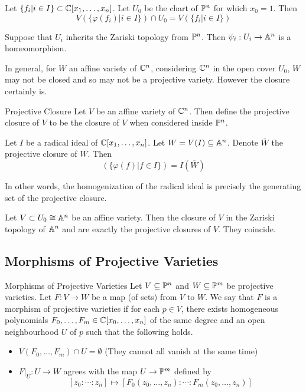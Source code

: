 \documentclass[a4paper]{article}
\begin{document}
\begin{lmm}{}{} Let $\{f_i|i\in I\}\subset\mathbb{C}[x_1,\dots,x_n]$. Let $U_0$ be the chart of $\mathbb{P}^n$ for which $x_0=1$. Then $$V(\{\varphi(f_i)|i\in I\})\cap U_0=V(\{f_i|i\in I\})$$
\end{lmm}

\begin{thm}{}{} Suppose that $U_i$ inherits the Zariski topology from $\mathbb{P}^n$. Then $\psi_i:U_i\to\mathbb{A}^n$ is a homeomorphism. 
\end{thm}

In general, for $W$ an affine variety of $\mathbb{C}^n$, considering $\mathbb{C}^n$ in the open cover $U_0$, $W$ may not be closed and so may not be a projective variety. However the closure certainly is. 

\begin{defn}{Projective Closure}{} Let $V$ be an affine variety of $\mathbb{C}^n$. Then define the projective closure of $V$ to be the closure of $V$ when considered inside $\mathbb{P}^n$. 
\end{defn}

\begin{prp}{}{} Let $I$ be a radical ideal of $\mathbb{C}[x_1,\dots,x_n]$. Let $W=V(I)\subseteq\mathbb{A}^n$. Denote $\overline{W}$ the projective closure of $W$. Then $$(\{\varphi(f)|f\in I\})=I(\overline{W})$$
\end{prp}

In other words, the homogenization of the radical ideal is precisely the generating set of the projective closure. 


\begin{prp}{}{} Let $V\subset U_0\cong\mathbb{A}^n$ be an affine variety. Then the closure of $V$ in the Zariski topology of $\mathbb{A}^n$ and are exactly the projective closures of $V$. They coincide. 
\end{prp}

\subsection{Morphisms of Projective Varieties}
\begin{defn}{Morphisms of Projective Varieties}{} Let $V\subseteq\mathbb{P}^n$ and $W\subseteq\mathbb{P}^m$ be projective varieties. Let $F:V\to W$ be a map (of sets) from $V$ to $W$. We say that $F$ is a morphism of projective varieties if for each $p\in V$, there exists homogeneous polynomials $F_0,\dots,F_m\in\mathbb{C}[x_0,\dots,x_n]$ of the same degree and an open neighbourhood $U$ of $p$ such that the following holds. 
\begin{itemize}
\item $V(F_0,\dots,F_m)\cap U=\emptyset$ (They cannot all vanish at the same time)
\item $F|_U:U\to W$ agrees with the map $U\to\mathbb{P}^m$ defined by $$[z_0:\cdots:z_n]\mapsto[F_0(z_0,\dots,z_n):\cdots:F_m(z_0,\dots,z_n)]$$
\end{itemize}
\end{defn}
\end{document}
